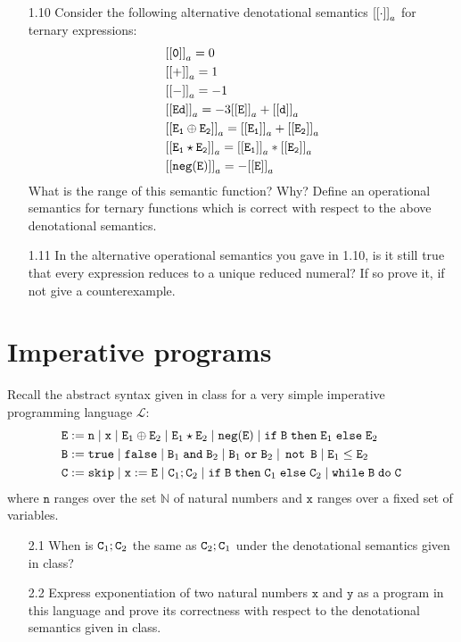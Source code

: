 \documentclass{article}
\begin{document}
\begin{enumerate}
\item[1.10] Consider the following alternative denotational semantics $\mathtt{[[{\cdot}]]}_a$ for ternary expressions:
\begin{align*}
& \mathtt{[[{\mathtt{0}}]]}_a = 0 \\ & \mathtt{[[{\mathtt{+}}]]}_a = 1 \\ & \mathtt{[[{\mathtt{-}}]]}_a = -1 \\
& \mathtt{[[{\mathtt{E} \mathtt{d}}]]}_a = -3\mathtt{[[{E}]]}_a + \mathtt{[[{\mathtt{d}}]]}_a \\
& \mathtt{[[{\mathtt{E}_1 \oplus \mathtt{E}_2}]]}_a = \mathtt{[[{\mathtt{E}_1}]]}_a + \mathtt{[[{\mathtt{E}_2}]]}_a \\
& \mathtt{[[{\mathtt{E}_1 \star \mathtt{E}_2}]]}_a = \mathtt{[[{\mathtt{E}_1}]]}_a * \mathtt{[[{\mathtt{E}_2}]]}_a \\
& \mathtt{[[{\mathtt{neg}(\mathtt{E})}]]}_a = -\mathtt{[[{\mathtt{E}}]]}_a
\end{align*}
What is the range of this semantic function? Why? Define an operational semantics for ternary functions which is correct with respect to the above denotational semantics.

\item[1.11] In the alternative operational semantics you gave in 1.10, is it still true that every expression reduces to a unique reduced numeral? If so prove it, if not give a counterexample. 
\end{enumerate}

\section{Imperative programs}
Recall the abstract syntax given in class for a very simple imperative programming language $\mathcal{L}$:
\begin{align*}
& \mathtt{E} := \mathtt{n} \; | \; \mathtt{x} \; | \; \mathtt{E}_1 \oplus \mathtt{E}_2 \; | \; \mathtt{E}_1 \star \mathtt{E}_2 \; | \; \mathtt{neg}(\mathtt{E}) \; | \; \mathtt{if} \; \mathtt{B} \; \mathtt{then} \; \mathtt{E}_1 \; \mathtt{else} \; \mathtt{E}_2 \\ 
& \mathtt{B} := \mathtt{true} \; | \; \mathtt{false} \; | \; \mathtt{B}_1 \; \mathtt{and} \; \mathtt{B}_2 \; | \; \mathtt{B}_1 \; \mathtt{or} \; \mathtt{B}_2 \; | \; \mathop{\mathtt{not}} \; \mathtt{B} \; | \; \mathtt{E}_1 \leq \mathtt{E}_2 \\
& \mathtt{C} := \mathtt{skip} \; | \; \mathtt{x} := \mathtt{E} \; | \; \mathtt{C}_1 ; \mathtt{C}_2 \; | \; \mathtt{if} \; \mathtt{B} \; \mathtt{then} \; \mathtt{C}_1 \; \mathtt{else} \; \mathtt{C}_2 \; | \; \mathtt{while} \; \mathtt{B} \; \mathtt{do} \; \mathtt{C}
\end{align*}
where $\mathtt{n}$ ranges over the set $\mathbb{N}$ of natural numbers and $\mathtt{x}$ ranges over a fixed set of variables.

\begin{enumerate}
\item[2.1] When is $\mathtt{C}_1 ; \mathtt{C}_2$ the same as $\mathtt{C}_2 ; \mathtt{C}_1$ under the denotational semantics given in class?

\item[2.2] Express exponentiation of two natural numbers $\mathtt{x}$ and $\mathtt{y}$ as a program in this language and prove its correctness with respect to the denotational semantics given in class.
\end{enumerate}
\end{document}
